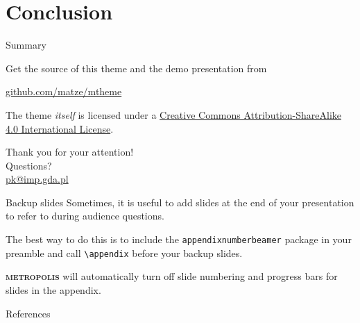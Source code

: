 \documentclass[10pt]{beamer} %
\newcommand{\themename}{\textbf{\textsc{metropolis}}\xspace}
\begin{document}
\section{Conclusion}
\begin{frame}{Summary}

  Get the source of this theme and the demo presentation from

  \begin{center}\url{github.com/matze/mtheme}\end{center}

  The theme \emph{itself} is licensed under a
  \href{http://creativecommons.org/licenses/by-sa/4.0/}{Creative Commons
  Attribution-ShareAlike 4.0 International License}.

  \begin{center}\ccbysa\end{center}

\end{frame}
{
\begin{frame}[standout]
  Thank you for your attention!\\ \vspace{12pt}
  Questions?\\ \vspace{12pt}
  \url{pk@imp.gda.pl}
\end{frame}
}
\appendix
\begin{frame}[fragile]{Backup slides}
  Sometimes, it is useful to add slides at the end of your presentation to
  refer to during audience questions.

  The best way to do this is to include the \verb|appendixnumberbeamer|
  package in your preamble and call \verb|\appendix| before your backup slides.

  \themename will automatically turn off slide numbering and progress bars for
  slides in the appendix.
\end{frame}
\begin{frame}[t,allowframebreaks]{References} %

  
  

\end{frame}
\end{document}
